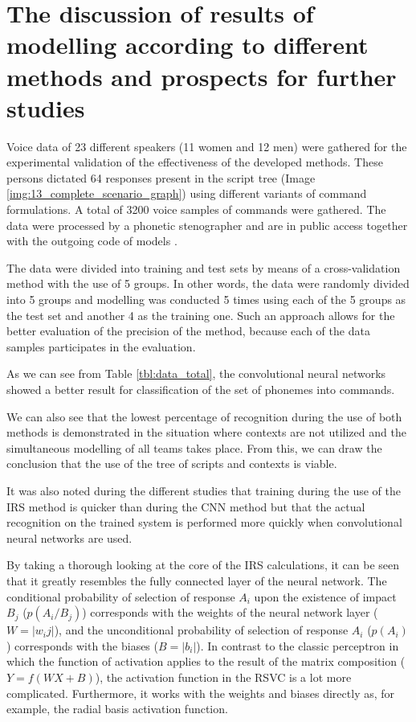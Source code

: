 \section{The discussion of results of modelling according to different methods and prospects for further studies}

Voice data of 23 different speakers (11 women and 12 men) were gathered for the experimental validation of the effectiveness of the developed methods. These persons dictated 64 responses present in the script tree (Image \ref{img:13_complete_scenario_graph}) using different variants of command formulations. A total of 3200 voice samples of commands were gathered. The data were processed by a phonetic stenographer and are in public access together with the outgoing code of models \cite{code1,code2}. 

The data were divided into training and test sets by means of a cross-validation method with the use of 5 groups. In other words, the data were randomly divided into 5 groups and modelling was conducted 5 times using each of the 5 groups as the test set and another 4 as the training one. Such an approach allows for the better evaluation of the precision of the method, because each of the data samples participates in the evaluation.

As we can see from Table \ref{tbl:data_total}, the convolutional neural networks showed a better result for classification of the set of phonemes into commands. 

We can also see that the lowest percentage of recognition during the use of both methods is demonstrated in the situation where contexts are not utilized and the simultaneous modelling of all teams takes place. From this, we can draw the conclusion that the use of the tree of scripts and contexts is viable. 

It was also noted during the different studies that training during the use of the IRS method is quicker than during the CNN method but that the actual recognition on the trained system is performed more quickly when convolutional neural networks are used. 

By taking a thorough looking at the core of the IRS calculations, it can be seen that it greatly resembles the fully connected layer of the neural network. The conditional probability of selection of response $A_i$ upon the existence of impact $B_j$ ($p(A_i/B_j)$) corresponds with the weights of the neural network layer ($W = |w_ij|$), and the unconditional probability of selection of response $A_i$ ($p(A_i)$) corresponds with the biases ($B = |b_i|$). In contrast to the classic perceptron in which the function of activation applies to the result of the matrix composition ($Y=f(WX + B)$), the activation function in the RSVC is a lot more complicated. Furthermore, it works with the weights and biases directly as, for example, the radial basis activation function. 

